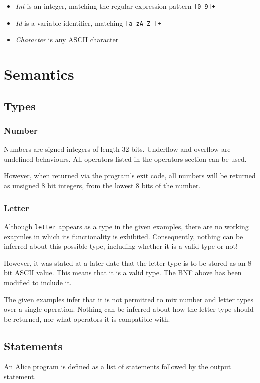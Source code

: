 \documentclass[a4wide, 11pt]{article}
\begin{document}
\begin{itemize}
\item \emph{Int} is an integer, matching the regular expression pattern \verb:[0-9]+:
\item \emph{Id} is a variable identifier, matching \verb:[a-zA-Z_]+:
\item \emph{Character} is any ASCII character
\end{itemize}

\section{Semantics}
\subsection{Types}
\subsubsection{Number}
Numbers are signed integers of length 32 bits. Underflow and overflow are
undefined behaviours. All operators listed in the operators section can be
used.

However, when returned via the program's exit code, all numbers will be
returned as unsigned 8 bit integers, from the lowest 8 bits of the number.

\subsubsection{Letter}
Although \verb:letter: appears as a type in the given examples, there are no
working exapmles in which its functionality is exhibited. Consequently, nothing
can be inferred about this possible type, including whether it is a valid type
or not!

However, it was stated at a later date that the letter type is to be stored as
an 8-bit ASCII value. This means that it is a valid type. The BNF above has been
modified to include it.

The given examples infer that it is not permitted to mix number and letter types
over a single operation. Nothing can be inferred about how the letter type should
be returned, nor what operators it is compatible with.

\subsection{Statements}
An Alice program is defined as a list of statements followed by the output
statement.
\end{document}
